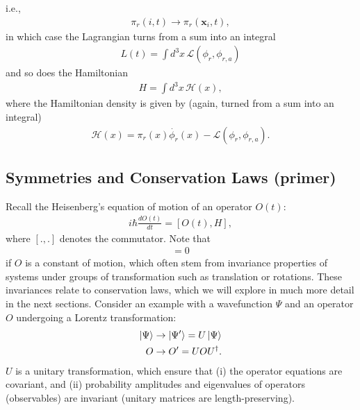 \documentclass[a4paper,11pt]{article}
\numberwithin{equation}{section}
\theoremstyle{definition}
\newcommand{\lag}{\mathcal{L}}
\begin{document}
i.e., 
\begin{align}
\pi_r(i,t) \to \pi_r(\mathbf{x}_i,t),
\end{align}
in which case the Lagrangian turns from a sum into an integral
\begin{align}
L(t) = \int d^3x\, \lag(\phi_r, \phi_{r,a})
\end{align}
and so does the Hamiltonian
\begin{align}
H = \int d^3x\, \mathcal{H}(x),
\end{align}
where the Hamiltonian density is given by (again, turned from a sum into an integral)
\begin{align}
\mathcal{H}(x) = \pi_r(x)\dot{\phi_r}(x) - \lag(\phi_r, \phi_{r,a}).
\end{align}
\subsection{Symmetries and Conservation Laws (primer)}
Recall the Heisenberg's equation of motion of an operator $O(t)$:
\begin{align}
i\hbar \frac{dO(t)}{dt} = [O(t), H],
\end{align}
where $[.,.]$ denotes the commutator. Note that
\begin{align}
[O, H] = 0
\end{align}
if $O$ is a constant of motion, which often stem from invariance properties of systems under groups of transformation such as translation or rotations. These invariances relate to conservation laws, which we will explore in much more detail in the next sections. Consider an example with a wavefunction $\Psi$ and an operator $O$ undergoing a Lorentz transformation:
\begin{align}
\ket{\Psi} &\to \ket{\Psi'} = U\ket{\Psi}\\
O &\to O' = UOU^\dagger.
\end{align}
$U$ is a unitary transformation, which ensure that (i) the operator equations are covariant, and (ii) probability amplitudes and eigenvalues of operators (observables) are invariant (unitary matrices are length-preserving).\\
\end{document}

